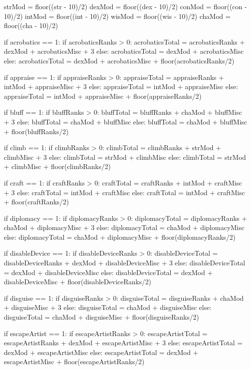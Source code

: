\begin{python}
strMod = floor((str - 10)/2)
dexMod = floor((dex - 10)/2)
conMod = floor((con - 10)/2)
intMod = floor((int - 10)/2)
wisMod = floor((wis - 10)/2)
chaMod = floor((cha - 10)/2)



if acrobatics == 1:
	 if acrobaticsRanks > 0:
	  acrobaticsTotal = acrobaticsRanks + dexMod + acrobaticsMisc + 3
	 else:
	  acrobaticsTotal = dexMod + acrobaticsMisc
else:
	 acrobaticsTotal = dexMod + acrobaticsMisc + floor(acrobaticsRanks/2)

if appraise == 1:
	 if appraiseRanks > 0:
	  appraiseTotal = appraiseRanks + intMod + appraiseMisc + 3
	 else:
	  appraiseTotal = intMod + appraiseMisc
else:
	 appraiseTotal = intMod + appraiseMisc + floor(appraiseRanks/2)

if bluff == 1:
	 if bluffRanks > 0:
	  bluffTotal = bluffRanks + chaMod + bluffMisc + 3
	 else:
	  bluffTotal = chaMod + bluffMisc
else:
	 bluffTotal = chaMod + bluffMisc + floor(bluffRanks/2)

if climb == 1:
	 if climbRanks > 0:
	  climbTotal = climbRanks + strMod + climbMisc + 3
	 else:
	  climbTotal = strMod + climbMisc
else:
	 climbTotal = strMod + climbMisc + floor(climbRanks/2)

if craft == 1:
	 if craftRanks > 0:
	  craftTotal = craftRanks + intMod + craftMisc + 3
	 else:
	  craftTotal = intMod + craftMisc
else:
	 craftTotal = intMod + craftMisc + floor(craftRanks/2)

if diplomacy == 1:
	 if diplomacyRanks > 0:
	  diplomacyTotal = diplomacyRanks + chaMod + diplomacyMisc + 3
	 else:
	  diplomacyTotal = chaMod + diplomacyMisc
else:
	 diplomacyTotal = chaMod + diplomacyMisc + floor(diplomacyRanks/2)

if disableDevice == 1:
	 if disableDeviceRanks > 0:
	  disableDeviceTotal = disableDeviceRanks + dexMod + disableDeviceMisc + 3
	 else:
	  disableDeviceTotal = dexMod + disableDeviceMisc
else:
	 disableDeviceTotal = dexMod + disableDeviceMisc + floor(disableDeviceRanks/2)

if disguise == 1:
	 if disguiseRanks > 0:
	  disguiseTotal = disguiseRanks + chaMod + disguiseMisc + 3
	 else:
	  disguiseTotal = chaMod + disguiseMisc
else:
	 disguiseTotal = chaMod + disguiseMisc + floor(disguiseRanks/2)

if escapeArtist == 1:
	 if escapeArtistRanks > 0:
	  escapeArtistTotal = escapeArtistRanks + dexMod + escapeArtistMisc + 3
	 else:
	  escapeArtistTotal = dexMod + escapeArtistMisc
else:
	 escapeArtistTotal = dexMod + escapeArtistMisc + floor(escapeArtistRanks/2)


\end{python}
